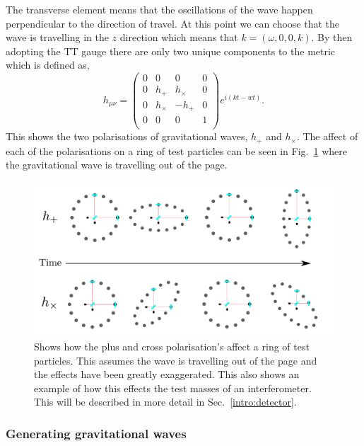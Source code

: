 The transverse element means that the oscillations of the wave happen perpendicular to the direction of travel.
At this point we can choose that the wave is travelling in the $z$ direction which means that $k = (\omega,0,0,k)$.
By then adopting the TT gauge there are only two unique components to the metric which is defined as,
\begin{equation}
h_{\mu \nu} = \left( 
\begin{matrix}
0 & 0 & 0 & 0 \\
0 & h_{+} & h_{\times} & 0 \\
0 & h_{\times} & -h_{+} & 0 \\
0 & 0 & 0 & 1 \\
\end{matrix}
\right) 
e^{i(kt - wt)}.
\end{equation}
This shows the two polarisations of gravitational waves, $h_{+}$ and $h_{\times}$.
The affect of each of the polarisations on a ring of test particles can be seen in Fig.~\ref{gw:polarisations} where the gravitational wave is travelling out of the page.

\begin{figure}[h]
    \centering
    \includegraphics[width=\textwidth]{C1_intro/polarisation_ring.pdf}
    \caption{Shows how the plus and cross polarisation's affect a ring of test particles. This assumes the wave is travelling out of the page and the effects have been greatly exaggerated. This also shows an example of how this effects the test masses of an interferometer. This will be described in more detail in Sec.~\ref{intro:detector}.}
    \label{gw:polarisations}
\end{figure}



\subsubsection{Generating gravitational waves}

